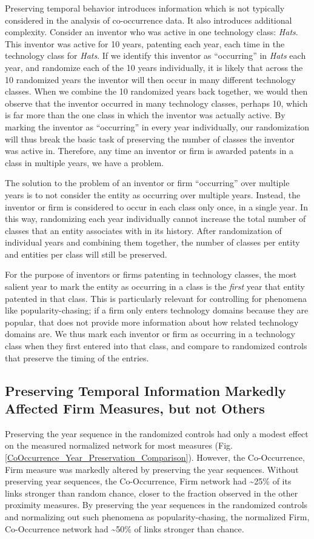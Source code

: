 \documentclass[]{svjour3}
\begin{document}
Preserving temporal behavior introduces information which is not typically considered in the analysis of co-occurrence data. It also introduces additional complexity. Consider an inventor who was active in one technology class: \textit{Hats}. This inventor was active for 10 years, patenting each year, each time in the technology class for \textit{Hats}. If we identify this inventor as ``occurring'' in \textit{Hats} each year, and randomize each of the 10 years individually, it is likely that across the 10 randomized years the inventor will then occur in  many different technology classes. When we combine the 10 randomized years back together, we would then observe that the inventor occurred in many technology classes, perhaps 10, which is far more than the one class in which the inventor was actually active. By marking the inventor as ``occurring'' in every year individually, our randomization will thus break the  basic task of preserving the number of classes the inventor was active in. Therefore, any time an inventor or firm is awarded patents in a class in multiple years, we have a problem.

The solution to the problem of an inventor or firm ``occurring'' over multiple years is to not consider the entity as occurring over multiple years. Instead, the inventor or firm is considered to occur in each class only once, in a single year. In this way, randomizing each year individually cannot increase the total number of classes that an entity associates with in its history. After randomization of individual years and combining them together, the number of classes per entity and entities per class will still be preserved. 

For the purpose of inventors or firms patenting in technology classes, the most salient year to mark the entity as occurring in a class is the \textit{first} year that entity patented in that class. This is particularly relevant for controlling for phenomena like popularity-chasing; if a firm only enters technology domains because they are popular, that does not provide more information about how related technology domains are. We thus mark each inventor or firm as occurring in a technology class when they first entered into that class, and compare to randomized controls that preserve the timing of the entries.

\subsection{Preserving Temporal Information Markedly Affected Firm Measures, but not Others}
Preserving the year sequence in the randomized controls had only a modest effect on the measured normalized network for most measures (Fig. \ref{CoOccurrence_Year_Preservation_Comparison}). However, the Co-Occurrence, Firm measure was markedly altered by preserving the year sequences. Without preserving year sequences, the Co-Occurrence, Firm network had \textasciitilde{}25\% of its links stronger than random chance, closer to the fraction observed in the other proximity measures. By preserving the year sequences in the randomized controls and normalizing out such phenomena as popularity-chasing, the normalized Firm, Co-Occurrence network had \textasciitilde{}50\% of links stronger than chance.
\end{document}
